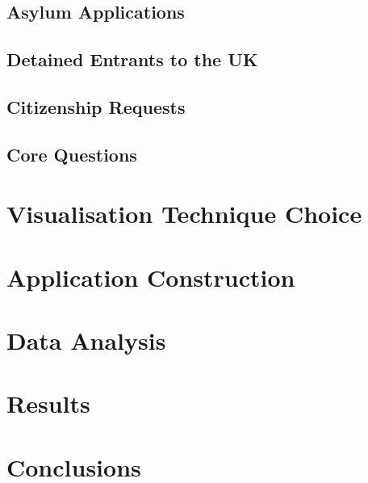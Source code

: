 \documentclass[11pt,a4paper,titlepage]{article}
\begin{document}
\subsection{Asylum Applications}
\subsection{Detained Entrants to the UK}
\subsection{Citizenship Requests}
\subsection{Core Questions}

\section{Visualisation Technique Choice}

\section{Application Construction}

\section{Data Analysis}

\section{Results}

\section{Conclusions}
\end{document}
